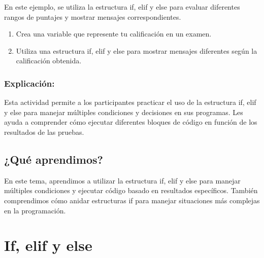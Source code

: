 \documentclass[
  a4paper,
  DIV=11,
  numbers=noendperiod,
  onepage,
  openany]{scrreprt}
\providecommand{\tightlist}{%
  \setlength{\itemsep}{0pt}\setlength{\parskip}{0pt}}\usepackage{longtable,booktabs,array}
\begin{document}
En este ejemplo, se utiliza la estructura if, elif y else para evaluar
diferentes rangos de puntajes y mostrar mensajes correspondientes.

\begin{tcolorbox}[enhanced jigsaw, leftrule=.75mm, bottomtitle=1mm, title=\textcolor{quarto-callout-tip-color}{\faLightbulb}\hspace{0.5em}{Actividad Práctica}, colbacktitle=quarto-callout-tip-color!10!white, coltitle=black, bottomrule=.15mm, colframe=quarto-callout-tip-color-frame, titlerule=0mm, opacityback=0, rightrule=.15mm, toptitle=1mm, opacitybacktitle=0.6, arc=.35mm, breakable, colback=white, toprule=.15mm, left=2mm]

\begin{enumerate}
\def\labelenumi{\arabic{enumi}.}
\tightlist
\item
  Crea una variable que represente tu calificación en un examen.
\item
  Utiliza una estructura if, elif y else para mostrar mensajes
  diferentes según la calificación obtenida.
\end{enumerate}

\end{tcolorbox}

\subsection{Explicación:}\label{explicaciuxf3n-19}

Esta actividad permite a los participantes practicar el uso de la
estructura if, elif y else para manejar múltiples condiciones y
decisiones en sus programas. Les ayuda a comprender cómo ejecutar
diferentes bloques de código en función de los resultados de las
pruebas.

\section{¿Qué aprendimos?}\label{quuxe9-aprendimos-4}

En este tema, aprendimos a utilizar la estructura if, elif y else para
manejar múltiples condiciones y ejecutar código basado en resultados
específicos. También comprendimos cómo anidar estructuras if para
manejar situaciones más complejas en la programación.

\chapter{If, elif y else}\label{if-elif-y-else}
\end{document}
